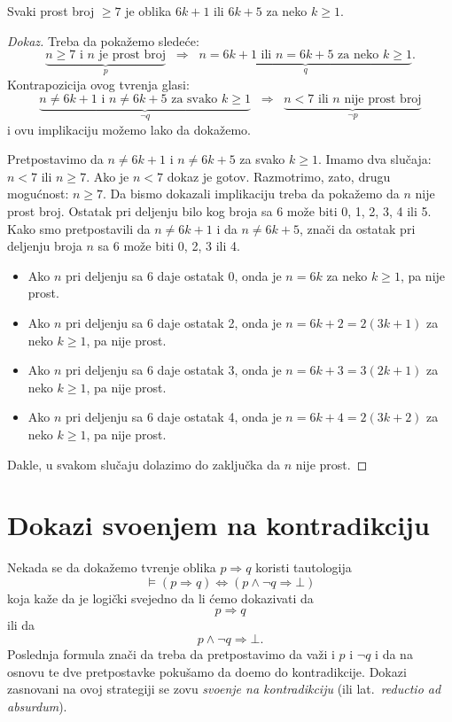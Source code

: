 \begin{EX}
  Svaki prost broj $\ge 7$ je oblika $6k + 1$ ili $6k + 5$ za neko $k \ge 1$.
\end{EX}
\begin{proof}[Dokaz]
  Treba da poka\v zemo slede\'ce:
  $$
    \underbrace{n \ge 7 \text{ i } n \text{ je prost broj}}_p
    \;\;\Rightarrow\;\;
    \underbrace{n = 6k + 1 \text{ ili } n = 6k + 5 \text{ za neko } k \ge 1}_q.
  $$
  Kontrapozicija ovog tvr\dj enja glasi:
  $$
    \underbrace{n \ne 6k + 1 \text{ i } n \ne 6k + 5 \text{ za svako } k \ge 1}_{\lnot q}
    \;\;\Rightarrow\;\;
    \underbrace{n < 7 \text{ ili } n \text{ nije prost broj}}_{\lnot p}
  $$
  i ovu implikaciju mo\v zemo lako da doka\v zemo.
  
  Pretpostavimo da $n \ne 6k + 1$ i $n \ne 6k + 5$ za svako $k \ge 1$. Imamo dva slu\v caja:
  $n < 7$ ili $n \ge 7$. Ako je $n < 7$ dokaz je gotov. Razmotrimo, zato, drugu mogu\'cnost: $n \ge 7$.
  Da bismo dokazali implikaciju treba da poka\v zemo da $n$ nije prost broj.
  Ostatak pri deljenju bilo kog broja sa $6$ mo\v ze biti 0, 1, 2, 3, 4 ili 5. Kako smo pretpostavili da
  $n \ne 6k + 1$ i da $n \ne 6k + 5$, zna\v ci da ostatak pri deljenju broja $n$ sa 6 mo\v ze biti
  0, 2, 3 ili 4.
  \begin{itemize}
  \item Ako $n$ pri deljenju sa 6 daje ostatak 0, onda je $n = 6k$ za neko $k \ge 1$, pa nije prost.
  \item Ako $n$ pri deljenju sa 6 daje ostatak 2, onda je $n = 6k + 2 = 2(3k + 1)$ za neko $k \ge 1$, pa nije prost.
  \item Ako $n$ pri deljenju sa 6 daje ostatak 3, onda je $n = 6k + 3 = 3(2k + 1)$ za neko $k \ge 1$, pa nije prost.
  \item Ako $n$ pri deljenju sa 6 daje ostatak 4, onda je $n = 6k + 4 = 2(3k + 2)$ za neko $k \ge 1$, pa nije prost.
  \end{itemize}
  Dakle, u svakom slu\v caju dolazimo do zaklju\v cka da $n$ nije prost.
\end{proof}


\section{Dokazi svo\dj enjem na kontradikciju}

Nekada se da doka\v zemo tvr\dj enje oblika $p \Rightarrow q$ koristi tautologija
$$
  \vDash (p \Rightarrow q) \Leftrightarrow (p \land \lnot q \Rightarrow \bot)
$$
koja ka\v ze da je logi\v cki svejedno da li \'cemo dokazivati da
$$
  p \Rightarrow q
$$
ili da
$$
  p \land \lnot q \Rightarrow \bot.
$$
Poslednja formula zna\v ci da treba da pretpostavimo da va\v zi i $p$ i $\lnot q$ i da
na osnovu te dve pretpostavke poku\v samo da do\dj emo do kontradikcije.
Dokazi zasnovani na ovoj strategiji se zovu \emph{svo\dj enje na kontradikciju} (ili lat.\ \emph{reductio ad absurdum}).

